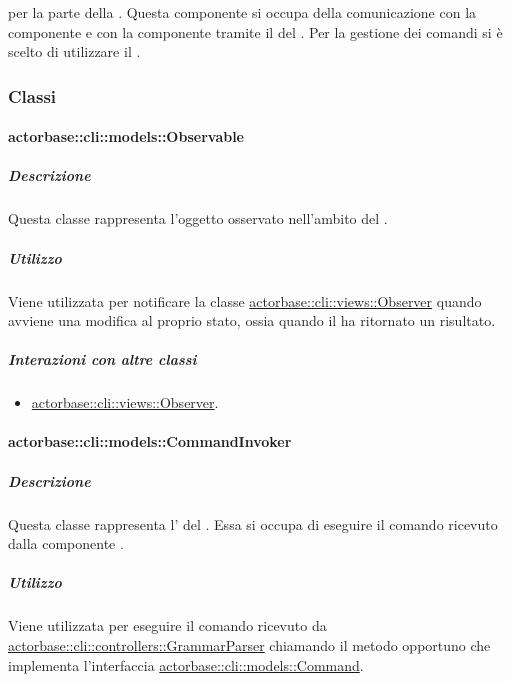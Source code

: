 \documentclass{scalatekids-article}
\begin{document}
 per la parte  della . Questa
componente si occupa della comunicazione con la componente  e
con la componente  tramite il  del  . Per la gestione dei comandi si è scelto di
utilizzare il .

\subsubsection{Classi}

\paragraph{actorbase::cli::models::Observable}
\label{sec:actorbase::cli::models::Observable}

\subparagraph{Descrizione}

Questa classe rappresenta l'oggetto osservato nell'ambito del  .

\subparagraph{Utilizzo}

Viene utilizzata per notificare la classe \hyperref[sec:actorbase::cli::views::Observer]{actorbase::cli::views::Observer}
quando avviene una modifica al proprio stato, ossia quando il 
ha ritornato un risultato.

\subparagraph{Interazioni con altre classi}

\begin{itemize}
\item \hyperref[sec:actorbase::cli::views::Observer]{actorbase::cli::views::Observer}.
\end{itemize}

\paragraph{actorbase::cli::models::CommandInvoker}
\label{sec:actorbase::cli::models::CommandInvoker}

\subparagraph{Descrizione}

Questa classe rappresenta l' del . Essa
si occupa di eseguire il comando ricevuto dalla componente .

\subparagraph{Utilizzo}

Viene utilizzata per eseguire il comando ricevuto da
\hyperref[sec:actorbase::cli::controllers::GrammarParser]{actorbase::cli::controllers::GrammarParser} chiamando il metodo opportuno che
implementa l'interfaccia \hyperref[sec:actorbase::cli::models::Command]{actorbase::cli::models::Command}.
\end{document}
